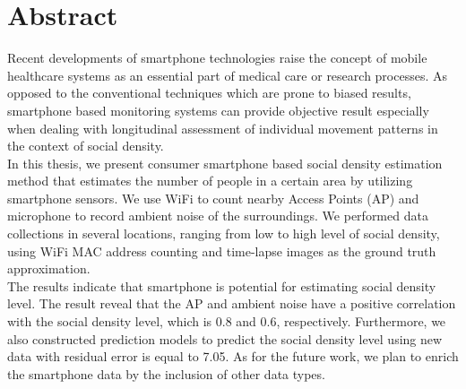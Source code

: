 \begingroup
\let\clearpage\relax
\let\cleardoublepage\relax
\let\cleardoublepage\relax

\chapter*{Abstract}
Recent developments of smartphone technologies raise the concept of mobile healthcare systems as an essential part of medical care or research processes. As opposed to the conventional techniques which are prone to biased results, smartphone based monitoring systems can provide objective result especially when dealing with longitudinal assessment of individual movement patterns in the context of social density.\\

\noindent
In this thesis, we present consumer smartphone based social density estimation method that estimates the number of people in a certain area by utilizing smartphone sensors. We use WiFi to count nearby Access Points (AP) and microphone to record ambient noise of the surroundings. We performed data collections in several locations, ranging from low to high level of social density, using WiFi MAC address counting and time-lapse images as the ground truth approximation.\\

\noindent
The results indicate that smartphone is potential for estimating social density level. The result reveal that the AP and ambient noise have a positive correlation with the social density level, which is 0.8 and 0.6, respectively. Furthermore, we also constructed prediction models to predict the social density level using new data with residual error is equal to 7.05. As for the future work, we plan to enrich the smartphone data by the inclusion of other data types.

\endgroup			

\vfill